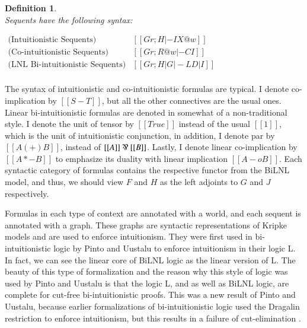 \documentclass{lmcs}
\newtheorem{definition}[theorem]{Definition}
\begin{document}
\begin{definition}
  \ \\
  \noindent
  Sequents have the following syntax:
  \begin{center}
    \begin{math}
      \begin{array}{rll}
        \text{(Intuitionistic Sequents)}   & [[Gr;H |-I X@w]]\\
        \text{(Co-intuitionistic Sequents)} & [[Gr;R@w |-C I]]\\
        \text{(LNL Bi-intuitionistic Sequents)} & [[Gr;H | G |-L D | I]]\\
      \end{array}
    \end{math}
  \end{center}
\end{definition}

The syntax of intuitionistic and co-intuitionistic formulas are
typical.  I denote co-implication by $[[S - T]]$, but all the other
connectives are the usual ones. Linear bi-intuitionistic formulas are
denoted in somewhat of a non-traditional style. I denote the unit of
tensor by $[[True]]$ instead of the usual $[[1]]$, which is the unit
of intuitionistic conjunction, in addition, I denote par by $[[A (+)
    B]]$, instead of $[[A]] \parr [[B]]$.  Lastly, I denote linear
co-implication by $[[A *- B]]$ to emphasize its duality with linear
implication $[[A -o B]]$.  Each syntactic category of formulas
contains the respective functor from the BiLNL model, and thus, we
should view $F$ and $H$ as the left adjoints to $G$ and $J$
respectively.

Formulas in each type of context are annotated with a world, and each
sequent is annotated with a graph.  These graphs are syntactic
representations of Kripke models and are used to enforce intuitionism.
They were first used in bi-intuitionistic logic by Pinto and Uustalu
\cite{Pinto:2009} to enforce intuitionism in their logic L.  In fact,
we can see the linear core of BiLNL logic as the linear version of L.
The beauty of this type of formalization and the reason why this style
of logic was used by Pinto and Uustalu is that the logic L, and as
well as BiLNL logic, are complete for cut-free bi-intuitionistic
proofs.  This was a new result of Pinto and Uustalu, because earlier
formalizations of bi-intuitionistic logic \cite{Crolard:2001} used the
Dragalin restriction \cite{Dragalin:1988} to enforce intuitionism, but
this results in a failure of cut-elimination
\cite{Schellinx:1991,Pinto:2009}.
\end{document}

